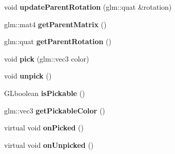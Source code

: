 \begin{DoxyCompactItemize}
\item 
\hypertarget{classfillwave_1_1models_1_1Entity_a19a6bc95be9e7fdb697762295b621f5a}{}void {\bfseries update\+Parent\+Rotation} (glm\+::quat \&rotation)\label{classfillwave_1_1models_1_1Entity_a19a6bc95be9e7fdb697762295b621f5a}

\item 
\hypertarget{classfillwave_1_1models_1_1Entity_a4ba3e493ac6cdea186887121f934516c}{}glm\+::mat4 {\bfseries get\+Parent\+Matrix} ()\label{classfillwave_1_1models_1_1Entity_a4ba3e493ac6cdea186887121f934516c}

\item 
\hypertarget{classfillwave_1_1models_1_1Entity_a93a01975a6bddd1d551d8f27e09d887d}{}glm\+::quat {\bfseries get\+Parent\+Rotation} ()\label{classfillwave_1_1models_1_1Entity_a93a01975a6bddd1d551d8f27e09d887d}

\item 
\hypertarget{classfillwave_1_1models_1_1Entity_af5aee0aab5f39f36c13964acc449ecac}{}void {\bfseries pick} (glm\+::vec3 color)\label{classfillwave_1_1models_1_1Entity_af5aee0aab5f39f36c13964acc449ecac}

\item 
\hypertarget{classfillwave_1_1models_1_1Entity_a03671255f61af07591bdd4cb6245bb18}{}void {\bfseries unpick} ()\label{classfillwave_1_1models_1_1Entity_a03671255f61af07591bdd4cb6245bb18}

\item 
\hypertarget{classfillwave_1_1models_1_1Entity_a4983228d7de32c49f0625ebe7deef4bb}{}G\+Lboolean {\bfseries is\+Pickable} ()\label{classfillwave_1_1models_1_1Entity_a4983228d7de32c49f0625ebe7deef4bb}

\item 
\hypertarget{classfillwave_1_1models_1_1Entity_a82afce21fa642d38fb236cc2630b9925}{}glm\+::vec3 {\bfseries get\+Pickable\+Color} ()\label{classfillwave_1_1models_1_1Entity_a82afce21fa642d38fb236cc2630b9925}

\item 
\hypertarget{classfillwave_1_1models_1_1Entity_ad982b344b6dda2451856c6c228540b09}{}virtual void {\bfseries on\+Picked} ()\label{classfillwave_1_1models_1_1Entity_ad982b344b6dda2451856c6c228540b09}

\item 
\hypertarget{classfillwave_1_1models_1_1Entity_acf69269a84cbd349a5ae02e969791bc4}{}virtual void {\bfseries on\+Unpicked} ()\label{classfillwave_1_1models_1_1Entity_acf69269a84cbd349a5ae02e969791bc4}


\end{DoxyCompactItemize}
